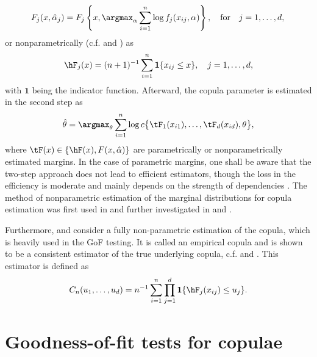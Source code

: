 \begin{equation}\label{eqn:pm}
	F_j(x,\hat\alpha_j) = F_j\left\{x,\argmax_{\alpha}\sum_{i=1}^n \log f_j(x_{ij},\alpha)\right\}, \quad\text{for}\quad j=1,\dots,d,\\
\end{equation}
or nonparametrically (c.f. \citet{chen_fan_2006} and \citet{chen_fan_tsyrennikov_2006}) as
\begin{equation}\label{eqn:npm}
	\hF_j(x) = (n+1)^{-1}\sum_{i=1}^n \mathbf{1}\{x_{ij}\leq x\}, \quad j=1,\dots,d,
\end{equation}
with $\mathbf{1}$ being the indicator function. Afterward, the copula parameter is estimated in the second step as 
%
\begin{equation}\label{eqn:ifm}
	\hat\theta = \argmax_{\theta}\sum_{i = 1}^n\log c\big\{\tF_1(x_{i1}), \ldots, \tF_d(x_{id}), \theta\big\},
\end{equation}
where $\tF(x)\in\{\hF(x),F(x,\hat\alpha)\}$ are parametrically or nonparametrically estimated margins. In the case of parametric margins, one shall be aware that the two-step approach does not lead to efficient estimators, though the loss in the efficiency is moderate and mainly depends on the strength of dependencies \citep{joe_1997}. The method of nonparametric estimation of the marginal distributions for copula estimation was first used in \citet{oakes_1994} and further investigated in \citet{genest_ghoudi_rivest_1995} and \citet{shih_louis_1995}. 

Furthermore, \citet{fermanian_scaillet_2003} and \citet{chen_huang_2007} consider a fully non-parametric estimation of the copula, which is heavily used in the GoF testing. It is called an empirical copula and is shown to be a consistent estimator of the true underlying copula, c.f. \citet{gaensler_stute_1987} and \citet{fermanian_radulovic_wegkamp_2004}. This estimator is defined as 
\begin{equation*}
	C_n(u_1, \ldots, u_d) = n^{-1}\sum_{i=1}^n\prod_{j=1}^d \mathbf{1}\{\hF_j(x_{ij})\leq u_j\}.
\end{equation*}

\section[Goodness-of-fit tests for copulae]{Goodness-of-fit tests for copulae}\label{sec:gof}

